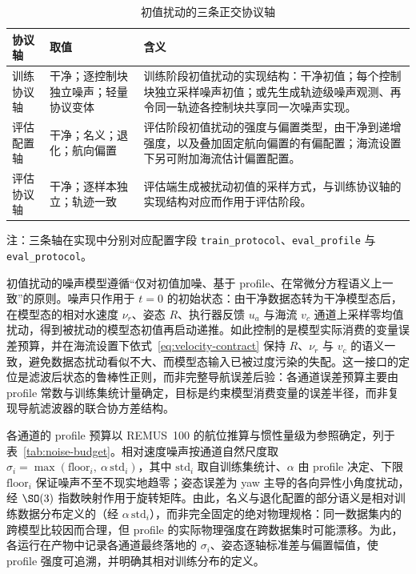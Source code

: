 \begin{table}[htbp]
  \centering
  \caption{初值扰动的三条正交协议轴}
  \label{tab:protocol-axes}
  \small
  \begin{tabularx}{\textwidth}{>{\raggedright\arraybackslash}p{}>{\raggedright\arraybackslash}p{}>{\raggedright\arraybackslash}X}
    \toprule
    协议轴 & 取值 & 含义 \\
    \midrule
    训练协议轴 & 干净；逐控制块独立噪声；轻量协议变体 & 训练阶段初值扰动的实现结构：干净初值；每个控制块独立采样噪声初值；或先生成轨迹级噪声观测、再令同一轨迹各控制块共享同一次噪声实现。 \\
    评估配置轴 & 干净；名义；退化；航向偏置 & 评估阶段初值扰动的强度与偏置类型，由干净到递增强度，以及叠加固定航向偏置的有偏配置；海流设置下另可附加海流估计偏置配置。 \\
    评估协议轴 & 干净；逐样本独立；轨迹一致 & 评估端生成被扰动初值的采样方式，与训练协议轴的实现结构对应而作用于评估阶段。 \\
    \bottomrule
  \end{tabularx}
  \par\vspace{2pt}
  \footnotesize 注：三条轴在实现中分别对应配置字段 \texttt{train\_protocol}、\texttt{eval\_profile} 与 \texttt{eval\_protocol}。
\end{table}

初值扰动的噪声模型遵循“仅对初值加噪、基于 profile、在常微分方程语义上一致”的原则。噪声只作用于 \(t=0\) 的初始状态：由干净数据态转为干净模型态后，在模型态的相对水速度 \(\nu_r\)、姿态 \(R\)、执行器反馈 \(u_a\) 与海流 \(v_c\) 通道上采样零均值扰动，得到被扰动的模型态初值再启动递推。如此控制的是模型实际消费的变量误差预算，并在海流设置下依式~\eqref{eq:velocity-contract} 保持 \(R\)、\(\nu_r\) 与 \(v_c\) 的语义一致，避免数据态扰动看似不大、而模型态输入已被过度污染的失配。这一接口的定位是滤波后状态的鲁棒性正则，而非完整导航误差后验：各通道误差预算主要由 profile 常数与训练集统计量确定，目标是约束模型消费变量的误差半径，而非复现导航滤波器的联合协方差结构。

各通道的 profile 预算以 REMUS~100 的航位推算与惯性量级为参照确定，列于表~\ref{tab:noise-budget}。相对速度噪声按通道自然尺度取 \(\sigma_i=\max(\text{floor}_i,\ \alpha\,\mathrm{std}_i)\)，其中 \(\mathrm{std}_i\) 取自训练集统计、\(\alpha\) 由 profile 决定、下限 \(\text{floor}_i\) 保证噪声不至不现实地趋零；姿态误差为 yaw 主导的各向异性小角度扰动，经 \(\SO(3)\) 指数映射作用于旋转矩阵。由此，名义与退化配置的部分语义是相对训练数据分布定义的（经 \(\alpha\,\mathrm{std}_i\)），而非完全固定的绝对物理规格：同一数据集内的跨模型比较因而合理，但 profile 的实际物理强度在跨数据集时可能漂移。为此，各运行在产物中记录各通道最终落地的 \(\sigma_i\)、姿态逐轴标准差与偏置幅值，使 profile 强度可追溯，并明确其相对训练分布的定义。

